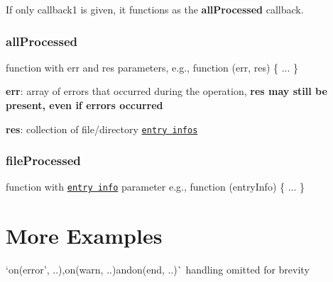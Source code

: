 If only callback1 is given, it functions as the {\bfseries all\+Processed} callback.

\subsubsection*{all\+Processed}


\begin{DoxyItemize}
\item function with err and res parameters, e.\+g., {\ttfamily function (err, res) \{ ... \}}
\item {\bfseries err}\+: array of errors that occurred during the operation, {\bfseries res may still be present, even if errors occurred}
\item {\bfseries res}\+: collection of file/directory \href{#entry-info}{\tt entry infos}
\end{DoxyItemize}

\subsubsection*{file\+Processed}


\begin{DoxyItemize}
\item function with \href{#entry-info}{\tt entry info} parameter e.\+g., {\ttfamily function (entry\+Info) \{ ... \}}
\end{DoxyItemize}

\section*{More Examples}

`on(\textquotesingle{}error', ..){\ttfamily ,}on(\textquotesingle{}warn\textquotesingle{}, ..){\ttfamily and}on(\textquotesingle{}end\textquotesingle{}, ..)\`{} handling omitted for brevity



